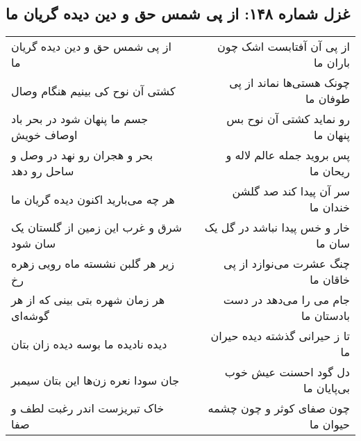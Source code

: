 \begin{center}
\section*{غزل شماره ۱۴۸: از پی شمس حق و دین دیده گریان ما}
\label{sec:0148}
\begin{longtable}{l p{0.5cm} r}
از پی شمس حق و دین دیده گریان ما
&&
از پی آن آفتابست اشک چون باران ما
\\
کشتی آن نوح کی بینیم هنگام وصال
&&
چونک هستی‌ها نماند از پی طوفان ما
\\
جسم ما پنهان شود در بحر باد اوصاف خویش
&&
رو نماید کشتی آن نوح بس پنهان ما
\\
بحر و هجران رو نهد در وصل و ساحل رو دهد
&&
پس بروید جمله عالم لاله و ریحان ما
\\
هر چه می‌بارید اکنون دیده گریان ما
&&
سر آن پیدا کند صد گلشن خندان ما
\\
شرق و غرب این زمین از گلستان یک سان شود
&&
خار و خس پیدا نباشد در گل یک سان ما
\\
زیر هر گلبن نشسته ماه رویی زهره رخ
&&
چنگ عشرت می‌نوازد از پی خاقان ما
\\
هر زمان شهره بتی بینی که از هر گوشه‌ای
&&
جام می را می‌دهد در دست بادستان ما
\\
دیده نادیده ما بوسه دیده زان بتان
&&
تا ز حیرانی گذشته دیده حیران ما
\\
جان سودا نعره زن‌ها این بتان سیمبر
&&
دل گود احسنت عیش خوب بی‌پایان ما
\\
خاک تبریزست اندر رغبت لطف و صفا
&&
چون صفای کوثر و چون چشمه حیوان ما
\\
\end{longtable}
\end{center}
